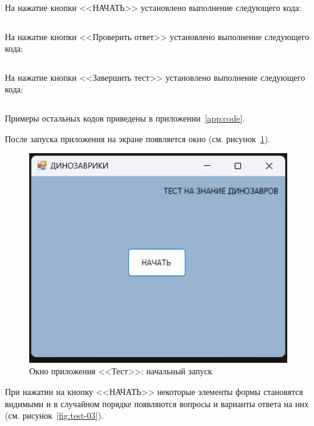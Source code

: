 \documentclass[bachelor, och, pract, times]{SCWorks}
\begin{document}
На нажатие кнопки <<НАЧАТЬ>> установлено выполнение следующего кода:
\inputminted[fontsize=\footnotesize]{cpp}{Тест/Start.cpp}

На нажатие кнопки <<Проверить ответ>> установлено выполнение следующего кода:
\inputminted[fontsize=\footnotesize]{cpp}{Тест/Check.cpp}

На нажатие кнопки <<Завершить тест>> установлено выполнение следующего кода:
\inputminted[fontsize=\footnotesize]{cpp}{Тест/Complite.cpp}

Примеры остальных кодов приведены в приложении~\ref{app:code}.

После запуска приложения на экране появляется окно (см. рисунок~\ref{fig:test-02}).

\begin{figure}[H]
    \centering
    \includegraphics[scale=0.7]{Скрины/Снимок экрана 2025-01-05 213834.png}
    \caption{Окно приложения <<Тест>>: начальный запуск}\label{fig:test-02}
\end{figure}

При нажатии на кнопку <<НАЧАТЬ>> некоторые элементы формы становятся видимыми и в случайном порядке появляются вопросы и варианты ответа на них (см. рисунок~\ref{fig:test-03}).
\end{document}
